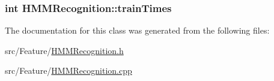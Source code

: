 \hypertarget{class_h_m_m_recognition_ad7bbe647d17214ad2b0de893bc03a8d5}{
\subsubsection[{train\+Times}]{\setlength{\rightskip}{0pt plus 5cm}int H\+M\+M\+Recognition\+::train\+Times\hspace{0.3cm}{\ttfamily [protected]}}}\label{class_h_m_m_recognition_ad7bbe647d17214ad2b0de893bc03a8d5}


The documentation for this class was generated from the following files\+:\begin{DoxyCompactItemize}
\item 
src/\+Feature/\hyperlink{_h_m_m_recognition_8h}{H\+M\+M\+Recognition.\+h}\item 
src/\+Feature/\hyperlink{_h_m_m_recognition_8cpp}{H\+M\+M\+Recognition.\+cpp}\end{DoxyCompactItemize}
